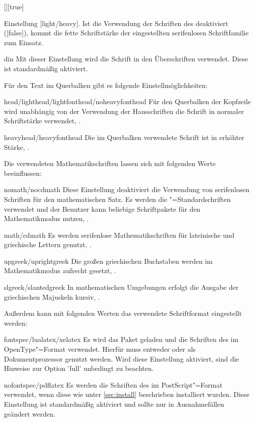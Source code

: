 \begin{Declaration}{[\PSet]}[true]
\begin{values}
  Einstellung [light/heavy]. Ist die Verwendung der Schriften 
  des \CDs deaktiviert ([false]), kommt die fette Schriftstärke 
  der eingestellten serifenlosen Schriftfamilie zum Einsatz.
\item[din]
  Mit dieser Einstellung wird die Schrift \DIN in den Überschriften verwendet. 
  Diese ist standardmäßig aktiviert.
\end{values}
%
Für den Text im Querbalken gibt es folgende Einstellmöglichkeiten:
%
\begin{values}
\item[head/lighthead/lightfonthead/noheavyfonthead]
  Für den Querbalken der Kopfzeile wird unabhängig von der Verwendung der 
  Hausschriften die Schrift \Univers in normaler Schriftstärke verwendet,
  .
\item[heavyhead/heavyfonthead]
  Die im Querbalken verwendete Schrift ist \Univers in erhöhter Stärke, 
  .
\end{values}
%
Die verwendeten Mathematikschriften lassen sich mit folgenden Werte 
beeinflussen:
%
\begin{values}
\item[nomath/nocdmath]  
  Diese Einstellung deaktiviert die Verwendung von serifenlosen Schriften für 
  den mathematischen Satz. Es werden die "=Standardschriften 
  verwendet und der Benutzer kann beliebige Schriftpakete für den 
  Mathematikmodus nutzen, .
\item[math/cdmath]
  Es werden serifenlose Mathematikschriften für lateinische und griechische 
  Lettern genutzt, .
\item[upgreek/uprightgreek]
  Die großen griechischen Buchstaben werden im Mathematikmodus aufrecht gesetzt,
  .
\item[slgreek/slantedgreek]
  In mathematischen Umgebungen erfolgt die Ausgabe der griechischen Majuskeln 
  kursiv, .
\end{values}
%
Außerdem kann mit folgenden Werten das verwendete Schriftformat eingestellt 
werden: 
%
\begin{values}
\item[fontspec/lualatex/xelatex]
  Es wird das Paket  geladen und die Schriften des \CDs im 
  OpenType"=Format verwendet. Hierfür muss entweder  oder 
   als Dokumentprozessor genutzt werden. Wird diese Einstellung 
  aktiviert, sind die Hinweise zur Option 'full' unbedingt 
  zu beachten.
\item[nofontspec/pdflatex]
  Es werden die Schriften des \CDs im PostScript"=Format verwendet, wenn diese 
  wie unter \autoref{sec:install} beschrieben installiert wurden. Diese 
  Einstellung ist standardmäßig aktiviert und sollte nur in Ausnahmefällen 
  geändert werden.
\end{values}
\end{Declaration}

